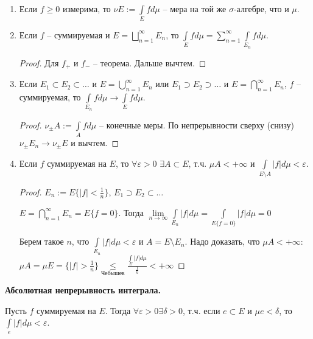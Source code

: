 \begin{corollary}~
    \begin{enumerate}
        \item Если $f\geq 0$ измерима, то $\nu E:= \int\limits_E f d\mu$ –
        мера на той же $\sigma$-алгебре, что и $\mu$.

        \item Если $f$ – суммируемая и $E=\bigsqcup\limits_{n=1}^\infty E_n$, 
        то $\int\limits_E f d\mu = \sum\limits_{n=1}^\infty \int\limits_{E_n} f d\mu$.

        \begin{proof}
            Для $f_+$ и $f_-$ – теорема. Дальше вычтем.
        \end{proof}

        \item Если $E_1\subset E_2\subset\dots$ и $E=\bigcup\limits_{n=1}^\infty E_n$
        или $E_1\supset E_2\supset\dots$ и $E=\bigcap\limits_{n=1}^\infty E_n$,
        $f$ – суммируемая, то $\int\limits_{E_n} fd \mu\rightarrow \int\limits_E f d\mu$.

        \begin{proof}
            $\nu_\pm A:= \int\limits_A f d\mu$ – конечные меры. По непрерывности сверху (снизу)
            $\nu_\pm E_n \rightarrow \nu_\pm E$ и вычтем.
        \end{proof}

        \item Если $f$ суммируемая на $E$, то $\forall \varepsilon > 0$ $\exists A \subset E$, т.ч.
        $\mu A<+\infty$ и $\int\limits_{E\setminus A} |f| d\mu<\varepsilon$.

        \begin{proof}
            $E_n:= E\{|f|<\frac{1}{n}\}$, $E_1\supset E_2\subset\dots$

            $E=\bigcap\limits_{n=1}^\infty E_n=E\{f=0\}$. Тогда $\lim\limits_{n\rightarrow \infty} 
            \int\limits_{E_n} |f| d\mu=\int\limits_{E\{f=0\}}|f| d\mu=0$

            Берем такое $n$, что $\int\limits_{E_n} |f| d\mu<\varepsilon$ и $A=E\setminus E_n$.
            Надо доказать, что $\mu A<+\infty$: $\mu A = \mu E=\{|f|>\frac{1}{n}\}\underset{\text{Чебышев}}{\leq}
            \frac{\int\limits_E |f| d\mu}{\frac{1}{n}}<+\infty$
        \end{proof}
    \end{enumerate}
\end{corollary}

\begin{theorem}
    \textbf{Абсолютная непрерывность интеграла.}

    Пусть $f$ суммируемая на $E$. Тогда $\forall\varepsilon>0 \exists \delta > 0$, т.ч. если 
    $e\subset E$ и $\mu e<\delta$, то $\int\limits_e |f| d\mu<\varepsilon$.
\end{theorem}

